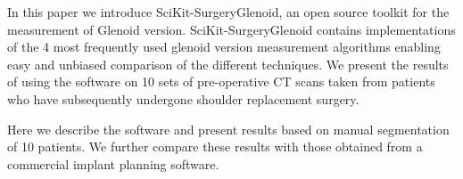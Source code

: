 In this paper we introduce SciKit-SurgeryGlenoid, an open source toolkit for the measurement
of Glenoid version. SciKit-SurgeryGlenoid contains implementations of the 4 most    
frequently used glenoid version measurement algorithms enabling easy and unbiased comparison of
the different techniques. We present the results of using the software on 10 sets of
pre-operative CT scans taken from patients who have subsequently undergone shoulder replacement surgery.

Here we describe the software and present results based on manual segmentation of 10
patients. We further compare these results with those obtained from a commercial
implant planning software.

